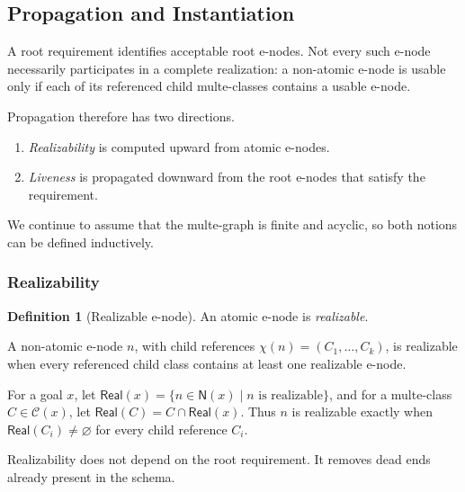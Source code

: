 \documentclass[sigconf,nonacm]{acmart}
\theoremstyle{definition}
\newtheorem{definition}{Definition}[section]
\theoremstyle{plain}
\theoremstyle{remark}
\begin{document}
\subsection{Propagation and Instantiation}
\label{sec:propagation}

A root requirement identifies acceptable root e-nodes.
Not every such e-node necessarily participates in a complete
realization: a non-atomic e-node is usable only if each of its
referenced child multe-classes contains a usable e-node.

Propagation therefore has two directions.

\begin{enumerate}

\item
\emph{Realizability} is computed upward from atomic e-nodes.

\item
\emph{Liveness} is propagated downward from the root e-nodes that
satisfy the requirement.

\end{enumerate}

We continue to assume that the multe-graph is finite and acyclic, so
both notions can be defined inductively.

\subsubsection{Realizability}

\begin{definition}[Realizable e-node]
An atomic e-node is \emph{realizable}.

A non-atomic e-node \(n\), with child references
\(\chi(n)=(C_1,\ldots,C_k)\),
is realizable when every referenced child class contains at least one
realizable e-node.
\end{definition}

For a goal \(x\), let
\(\mathsf{Real}(x) =
\{n\in\mathsf N(x)\mid n\text{ is realizable}\}\),
and for a multe-class \(C\in\mathcal C(x)\), let
\(\mathsf{Real}(C) = C\cap\mathsf{Real}(x)\).
Thus \(n\) is realizable exactly when
\(\mathsf{Real}(C_i)\neq\varnothing\) for every child reference
\(C_i\).

Realizability does not depend on the root requirement.  It removes
dead ends already present in the schema.
\end{document}

